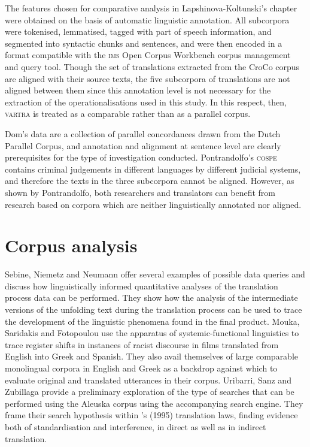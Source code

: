 \documentclass[output=paper]{LSP/langsci}
\begin{document}
The features chosen for comparative analysis in Lapshinova-Koltunski’s chapter were obtained on the basis of automatic linguistic annotation. All subcorpora were tokenised, lemmatised, tagged with part of speech information, and segmented into syntactic chunks and sentences, and were then encoded in a format compatible with the \textsc{ims} Open Corpus Workbench corpus management and query tool. Though the set of translations extracted from the CroCo corpus are aligned with their source texts, the five subcorpora of translations are not aligned between them since this annotation level is not necessary for the extraction of the operationalisations used in this study. In this respect, then, \textsc{vartra} is treated as a comparable rather than as a parallel corpus.

Dom’s data are a collection of parallel concordances drawn from the Dutch Parallel Corpus, and annotation and alignment at sentence level are clearly prerequisites for the type of investigation conducted. Pontrandolfo’s \textsc{cospe} contains criminal judgements in different languages by different judicial systems, and therefore the texts in the three subcorpora cannot be aligned. However, as shown by Pontrandolfo, both researchers and translators can benefit from research based on corpora which are neither linguistically annotated nor aligned. 

\section{Corpus analysis}
Sebine, Niemetz and Neumann offer several examples of possible data queries and discuss how linguistically informed quantitative analyses of the translation process data can be performed. They show how the analysis of the intermediate versions of the unfolding text during the translation process can be used to trace the development of the linguistic phenomena found in the final product. Mouka, Saridakis and Fotopoulou use the apparatus of systemic-functional linguistics to trace register shifts in instances of racist discourse in films translated from English into Greek and Spanish. They also avail themselves of large comparable monolingual corpora in English and Greek as a backdrop against which to evaluate original and translated utterances in their corpus. Uribarri, Sanz and Zubillaga provide a preliminary exploration of the type of searches that can be performed using the Aleuska corpus using the accompanying search engine. They frame their search hypothesis within \citeauthor{Toury1995}'s (1995) translation laws, finding evidence both of standardisation and interference, in direct as well as in indirect translation. 
\end{document}
